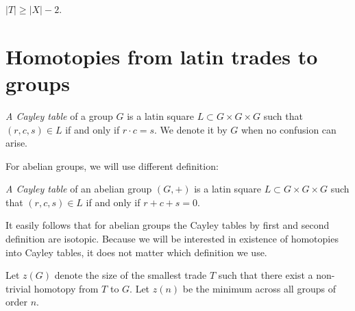 \begin{cor}
\label{cor:size-of-t}
$|T| \geq |X|-2$.
\end{cor}

\section{Homotopies from latin trades to groups}

\begin{defn}
\emph{A Cayley table} of a group $G$ is a latin square $L \subset G \times G \times G$ such that $(r,c,s) \in L$ if and only if $r \cdot c = s$. We denote it by $G$ when no confusion can arise.
\end{defn}

For abelian groups, we will use different definition:

\begin{defn}
\emph{A Cayley table} of an abelian group $(G,+)$ is a latin square $L \subset G \times G \times G$ such that $(r,c,s) \in L$ if and only if $r + c + s = 0$.
\end{defn}

It easily follows that for abelian groups the Cayley tables by first and second definition are isotopic. Because we will be interested in existence of homotopies into Cayley tables, it does not matter which definition we use.

\begin{defn}
Let $z(G)$ denote the size of the smallest trade $T$ such that there exist a non-trivial homotopy from $T$ to $G$. Let \emph{$z(n)$} be the minimum across all groups of order $n$.
\end{defn}


